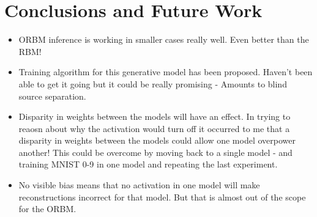 \chapter{Conclusions and Future Work}

\begin{itemize}
  \item ORBM inference is working in smaller cases really well. Even better than the RBM!
  \item Training algorithm for this generative model has been proposed. Haven't been able to get it going but it could be really promising - Amounts to blind source separation.
  \item Disparity in weights between the models will have an effect. In trying to reaosn about why the activation would turn off it occurred to me that a disparity in weights between the models could allow one model overpower another! This could be overcome by moving back to a single model - and training MNIST 0-9 in one model and repeating the last experiment.
  \item No visible bias means that no activation in one model will make reconstructions incorrect for that model. But that is almost out of the scope for the ORBM.
\end{itemize}
